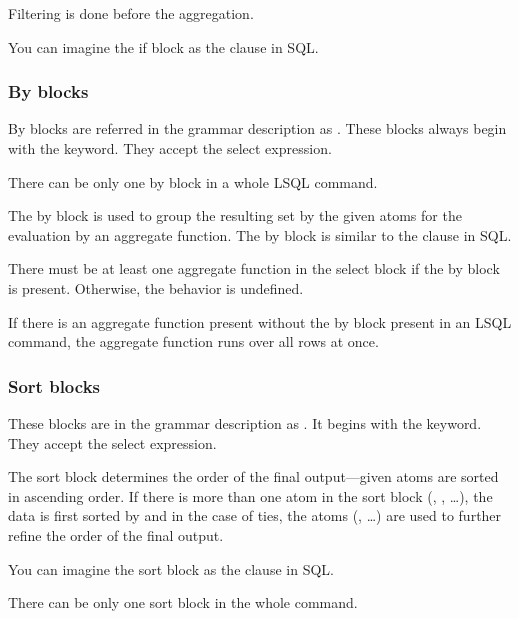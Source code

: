 Filtering is done before the aggregation.

You can imagine the if block as the  clause in SQL.

\subsubsection{By blocks}
By blocks are referred in the grammar description as .
These blocks always begin with the  keyword. They accept the select expression. 

There can be only one by block in a whole LSQL command.

The by block is used to group the resulting set by the given atoms for the evaluation by an aggregate function.
The by block is similar to the  clause in SQL. 

There must be at least one aggregate function in the select block if the by block is present. Otherwise, the behavior is undefined.

If there is an aggregate function present without the by block present in an LSQL command, the aggregate function runs over all rows at once.

\subsubsection{Sort blocks}
These blocks are in the grammar description as .
It begins with the  keyword. They accept the select expression.

The sort block determines the order of the final output---given atoms are sorted in ascending order.
If there is more than one atom in the sort block (, , \ldots), the data is first sorted by  
and in the case of ties, the atoms (, \ldots) are used to further refine the order of the final output.

You can imagine the sort block as the  clause in SQL.

There can be only one sort block in the whole command.

